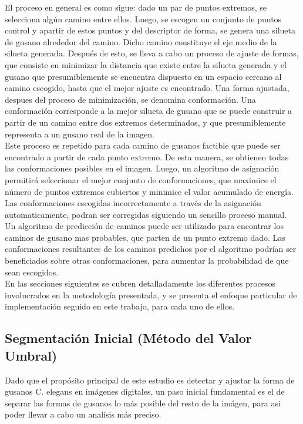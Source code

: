 El proceso en general es como sigue: dado un par de puntos extremos, se selecciona
alg\'un camino entre ellos. Luego, se escogen un conjunto de puntos control y
apartir de estos puntos y del descriptor de forma, 
se genera una silueta de gusano alrededor del camino. Dicho camino constituye el 
eje medio de la silueta generada. Despu\'es de esto, se lleva a cabo un proceso de 
ajuste de formas, que consiste en minimizar la distancia que existe entre la silueta
generada y el gusano que presumiblemente se encuentra dispuesto en un espacio 
cercano al camino escogido, hasta que el mejor ajuste es encontrado. Una forma ajustada,
despues del proceso de minimizaci\'on, se denomina conformaci\'on. Una conformaci\'on 
corresponde a la mejor silueta de gusano que se puede construir a partir de un camino
entre dos extremos determinados, y que presumiblemente representa a un gusano real
de la imagen. \\

Este proceso es repetido para cada camino de gusanos factible que puede ser encontrado
a partir de cada punto extremo. De esta manera, se obtienen todas las conformaciones
posibles en el imagen. Luego, un algoritmo de asignaci\'on permitir\'a seleccionar
el mejor conjunto de conformaciones, que maximice el n\'umero de puntos extremos cubiertos
y minimice el valor acumulado de energ\'ia. Las conformaciones escogidas incorrectamente
a trav\'es de la asignaci\'on automaticamente, podran ser corregidas siguiendo
un sencillo proceso manual.\\

Un algoritmo de predicci\'on de caminos puede ser utilizado para encontrar
los caminos de gusano mas probables, que parten de un punto extremo dado.
Las conformaciones resultantes de los caminos predichos por el algoritmo podr\'ian
ser beneficiados sobre otras conformaciones, para aumentar la probabilidad de que
sean escogidos.\\

En las secciones siguientes se cubren detalladamente los diferentes procesos
involucrados en la metodolog\'ia presentada, y se presenta el enfoque particular
de implementaci\'on seguido en este trabajo, para cada uno de ellos.
  

\subsection{Segmentaci\'on Inicial (M\'etodo del Valor Umbral)}
\label{sec:metthres}

Dado que el prop\'osito principal de este estudio es detectar y ajustar la forma de 
gusanos C. elegans en im\'agenes digitales, un paso inicial fundamental es el de separar
las formas de gusanos lo m\'as posible del resto de la im\'agen, para asi poder llevar a
cabo un anal\'isis m\'as preciso.\\

